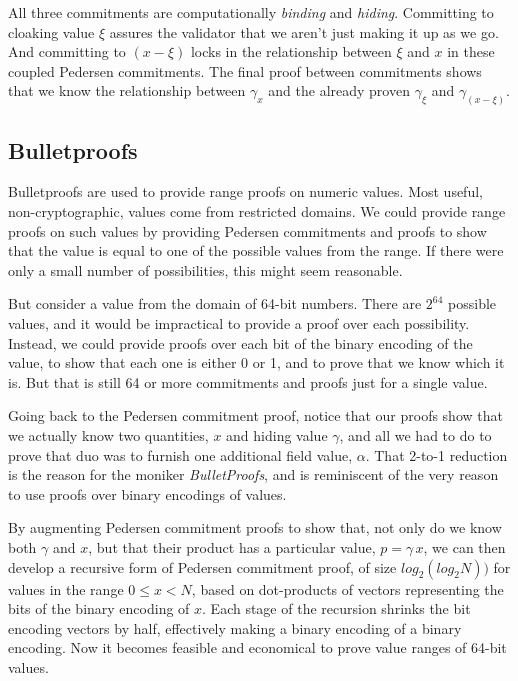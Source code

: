 \documentclass{yellowpaper}
\begin{document}
All three commitments are computationally {\em{binding}} and {\em{hiding}}. Committing to cloaking value $\xi$ assures the validator that we aren't just making it up as we go. And committing to $(x - \xi)$ locks in the relationship between $\xi$ and $x$ in these coupled Pedersen commitments. The final proof between commitments shows that we know the relationship between $\gamma_x$ and the already proven $\gamma_\xi$ and $\gamma_{(x-\xi)}$. 

\subsection{Bulletproofs}
Bulletproofs\cite{bulletproofs} are used to provide range proofs on numeric values. Most useful, non-cryptographic, values  come from restricted domains. We could provide range proofs on such values by providing Pedersen commitments and proofs to show that the value is equal to one of the possible values from the range. If there were only a small number of possibilities, this might seem reasonable.

But consider a value from the domain of 64-bit numbers. There are $2^{64}$ possible values, and it would be impractical to provide a proof over each possibility. Instead, we could provide proofs over each bit of the binary encoding of the value, to show that each one is either 0 or 1, and to prove that we know which it is. But that is still 64 or more commitments and proofs just for a single value.

Going back to the Pedersen commitment proof, notice that our proofs show that we actually know two quantities, $x$ and hiding value $\gamma$, and all we had to do to prove that duo was to furnish one additional field value, $\alpha$. That 2-to-1 reduction is the reason for the moniker {\em{BulletProofs}}, and is reminiscent of the very reason to use proofs over binary encodings of values. 

By augmenting Pedersen commitment proofs to show that, not only do we know both $\gamma$ and $x$, but that their product has a particular value, $p = \gamma \, x$, we can then develop a recursive form of Pedersen commitment proof, of size $log_2(log_2 N))$ for values in the range $0 \le x < N$, based on dot-products of vectors representing the bits of the binary encoding of $x$. Each stage of the recursion shrinks the bit encoding vectors by half, effectively making a binary encoding of a binary encoding. Now it becomes feasible and economical to prove value ranges of 64-bit values.
\end{document}
